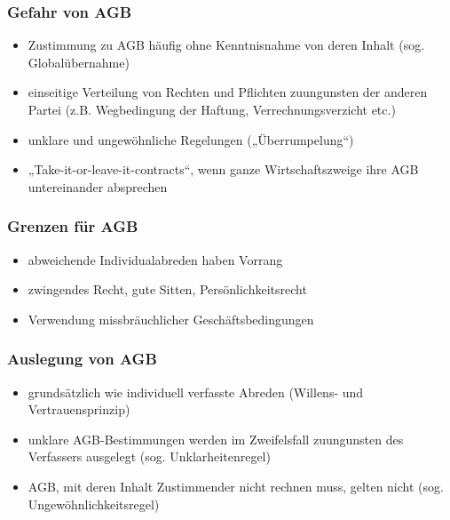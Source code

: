 \subsubsection{Gefahr von AGB}
\begin{itemize}
    \item Zustimmung zu AGB häufig ohne Kenntnisnahme von deren Inhalt (sog. Globalübernahme)
    \item einseitige Verteilung von Rechten und Pflichten zuungunsten der anderen Partei (z.B. Wegbedingung der Haftung, Verrechnungsverzicht etc.)
    \item unklare und ungewöhnliche Regelungen („Überrumpelung“)
    \item „Take-it-or-leave-it-contracts“, wenn ganze Wirtschaftszweige ihre AGB untereinander absprechen
\end{itemize}

\subsubsection{Grenzen für AGB}
\begin{itemize}
    \item abweichende Individualabreden haben Vorrang
    \item zwingendes Recht, gute Sitten, Persönlichkeitsrecht
    \item Verwendung missbräuchlicher Geschäftsbedingungen
\end{itemize}

\subsubsection{Auslegung von AGB}
\begin{itemize}
    \item grundsätzlich wie individuell verfasste Abreden (Willens- und Vertrauensprinzip)
    \item unklare AGB-Bestimmungen werden im Zweifelsfall zuungunsten des Verfassers ausgelegt (sog. Unklarheitenregel)
    \item AGB, mit deren Inhalt Zustimmender nicht rechnen muss, gelten nicht (sog. Ungewöhnlichkeitsregel)
\end{itemize}

